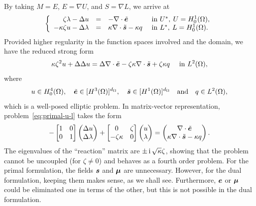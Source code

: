 By taking $M = E$, $E = \nabla U$, and $S = \nabla L$, we arrive at
\begin{align}
\left\lbrace
\begin{array}{rcll}
    \zeta\lambda-\Delta u &=& -\nabla\cdot\tilde{\bm{e}}& \text{ in } U^*,\: U = H^1_0(\Omega),\\
    -\kappa\zeta u-\Delta\lambda  &=& \kappa \nabla\cdot\tilde{\bm{s}}-\kappa q & \text{ in } L^*,\: L = H^1_0(\Omega).
\end{array}
\right. \label{eq:primal-u-l}
\end{align}
Provided higher regularity in the function spaces involved and the domain, we have the reduced strong form
$$
\kappa\zeta^2 u+\Delta \Delta \uF = \Delta\nabla\cdot \eFt-\zeta\kappa\nabla\cdot\sFt+\zeta\kappa q \quad\IN \Ltwo%
,$$
where
$$
u\in H^4_0(\Omega),
\quad
\tilde{\bm{e}} \in [H^3(\Omega)]^{d_\Omega},
\quad
\tilde{\bm{s}} \in [H^1(\Omega)]^{d_\Omega}
\quad\text{and}\quad
q\in L^2(\Omega), 
$$
which is a well-posed elliptic problem. In matrix-vector representation, problem~\eqref{eq:primal-u-l} takes the form
$$
-
\begin{bmatrix}
    1 & 0\\
    0 & 1
\end{bmatrix}
\begin{pmatrix}
    \Delta u \\
    \Delta \lambda 
\end{pmatrix}
+
\begin{bmatrix}
    0 & \zeta\\
    -\zeta\kappa & 0
\end{bmatrix}
\begin{pmatrix}
    u \\
    \lambda 
\end{pmatrix}
=
\begin{pmatrix}
    \nabla\cdot\tilde{\bm{e}}\\
    \kappa\nabla\cdot\tilde{\bm{s}}-\kappa q 
\end{pmatrix}.
$$
The eigenvalues of the ``reaction'' matrix are $\pm \,{\hbox{i}}\, \sqrt{\kappa}\zeta$, showing that the problem cannot be uncoupled (for $\zeta\neq 0$) and behaves as a fourth order problem. For the primal formulation, the fields $\bm{s}$ and $\bm{\mu}$ are unnecessary. However, for the dual formulation, keeping them makes sense, as we shall see. Furthermore, $\bm{e}$ or $\bm{\mu}$ could be eliminated one in terms of the other, but this is not possible in the dual formulation.

